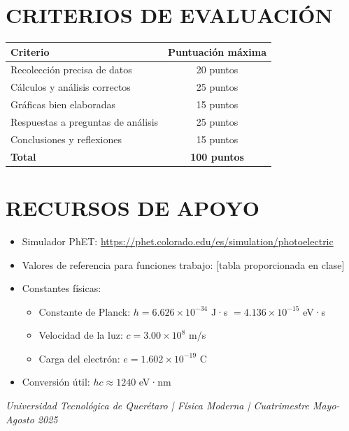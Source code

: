 \documentclass[12pt,a4paper]{article}
\begin{document}
	\section*{CRITERIOS DE EVALUACIÓN}
	
	\begin{center}
		\begin{tabular}{|l|c|}
			\hline
			\textbf{Criterio} & \textbf{Puntuación máxima} \\
			\hline
			Recolección precisa de datos & 20 puntos \\
			\hline
			Cálculos y análisis correctos & 25 puntos \\
			\hline
			Gráficas bien elaboradas & 15 puntos \\
			\hline
			Respuestas a preguntas de análisis & 25 puntos \\
			\hline
			Conclusiones y reflexiones & 15 puntos \\
			\hline
			\textbf{Total} & \textbf{100 puntos} \\
			\hline
		\end{tabular}
	\end{center}
	
	\section*{RECURSOS DE APOYO}
	
	\begin{itemize}
		\item Simulador PhET: \url{https://phet.colorado.edu/es/simulation/photoelectric}
		\item Valores de referencia para funciones trabajo: [tabla proporcionada en clase]
		\item Constantes físicas:
		\begin{itemize}
			\item Constante de Planck: $h = 6.626 \times 10^{-34}$ J·s $= 4.136 \times 10^{-15}$ eV·s
			\item Velocidad de la luz: $c = 3.00 \times 10^{8}$ m/s
			\item Carga del electrón: $e = 1.602 \times 10^{-19}$ C
		\end{itemize}
		\item Conversión útil: $hc \approx 1240$ eV·nm
	\end{itemize}
	
	\vfill
	
	\begin{center}
		\textcolor{uteqgray}{\textit{Universidad Tecnológica de Querétaro | Física Moderna | Cuatrimestre Mayo-Agosto 2025}}
	\end{center}
	
\end{document}
